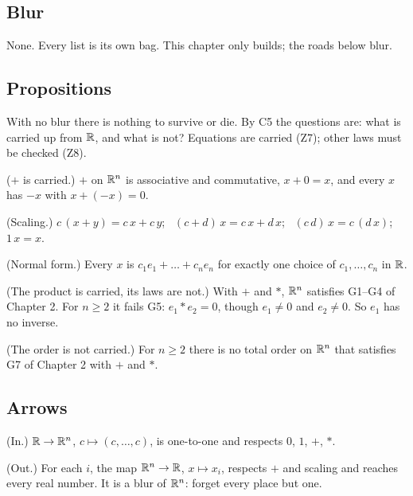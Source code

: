 \subsection*{Blur}

\begin{lines}
\item[] None. Every list is its own bag. This chapter only builds; the roads below blur.
\end{lines}

\subsection*{Propositions}

With no blur there is nothing to survive or die. By C5 the questions are: what is carried up from $\mathbb{R}$, and what is not? Equations are carried (Z7); other laws must be checked (Z8).
\begin{lines}
\item[\lab{P1}] ($+$ is carried.) $+$ on $\mathbb{R}^n$ is associative and commutative, $x + 0 = x$, and every $x$ has $-x$ with $x + (-x) = 0$.
\item[\lab{P2}] (Scaling.) $c\,(x + y) = c\,x + c\,y$; \ $(c + d)\,x = c\,x + d\,x$; \ $(c\,d)\,x = c\,(d\,x)$; \ $1\,x = x$.
\item[\lab{P3}] (Normal form.) Every $x$ is $c_1 e_1 + \dots + c_n e_n$ for exactly one choice of $c_1, \dots, c_n$ in $\mathbb{R}$.
\item[\lab{P4}] (The product is carried, its laws are not.) With $+$ and $\ast$, $\mathbb{R}^n$ satisfies G1--G4 of Chapter 2. For $n \ge 2$ it fails G5: $e_1 \ast e_2 = 0$, though $e_1 \neq 0$ and $e_2 \neq 0$. So $e_1$ has no inverse.
\item[\lab{P5}] (The order is not carried.) For $n \ge 2$ there is no total order on $\mathbb{R}^n$ that satisfies G7 of Chapter 2 with $+$ and $\ast$.
\end{lines}

\subsection*{Arrows}

\begin{lines}
\item[\lab{P6}] (In.) $\mathbb{R} \to \mathbb{R}^n$, $c \mapsto (c, \dots, c)$, is one-to-one and respects $0$, $1$, $+$, $\ast$.
\item[\lab{P7}] (Out.) For each $i$, the map $\mathbb{R}^n \to \mathbb{R}$, $x \mapsto x_i$, respects $+$ and scaling and reaches every real number. It is a blur of $\mathbb{R}^n$: forget every place but one.
\end{lines}

